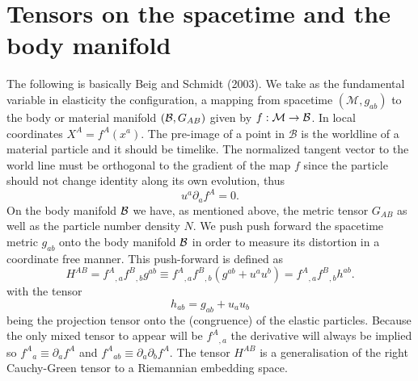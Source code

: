 \section{Tensors on the spacetime and the body manifold}

The following is basically Beig and Schmidt (2003). We take as the fundamental variable in elasticity the configuration, a mapping from spacetime $(\mathcal{M},g_{ab})$ to the body or material manifold $(\mathcal{B},G_{AB})$ given by $f:\mathcal{M}\rightarrow \mathcal{B}$. In local coordinates $X^A=f^A(x^a)$. The pre-image of a point in $\mathcal{B}$ is the worldline of a material particle and it should be timelike. The normalized tangent vector to the world line must be orthogonal to the gradient of the map $f$ since the particle should not change identity along its own evolution, thus
\begin{equation}
u^a\partial_a f^A = 0.
\end{equation}
On the body manifold $\mathcal{B}$ we have, as mentioned above, the metric tensor $G_{AB}$ as well as the particle number density $N$. We push push forward the spacetime metric $g_{ab}$ onto the body manifold $\mathcal{B}$ in order to measure its distortion in a coordinate free manner. This push-forward is defined as
\begin{equation}
H^{AB} = f^A{}_{,a}f^B{}_{,b}g^{ab} \equiv f^A{}_{,a}f^B{}_{,b}(g^{ab}+u^au^b) = f^A{}_{,a}f^B{}_{,b}h^{ab}.
\end{equation}
with the tensor
\begin{equation}
h_{ab} = g_{ab} + u_au_b
\end{equation}
being the projection tensor onto the (congruence) of the elastic particles. Because the only mixed tensor to appear will be $f^A{}_{,a}$ the derivative will always be implied so $f^A{}_a \equiv \partial_a f^A$ and $f^A{}_{ab} \equiv \partial_a\partial_b f^A$. The tensor $H^{AB}$ is a generalisation of the right Cauchy-Green tensor to a Riemannian embedding space.
